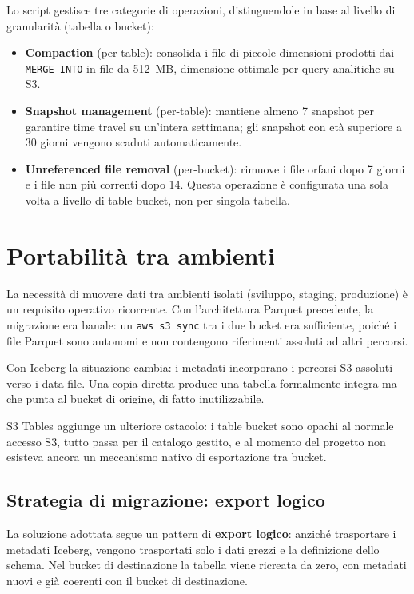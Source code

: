 \documentclass[12pt,a4paper,openright,twoside]{book}
\begin{document}
Lo script gestisce tre categorie di operazioni, distinguendole in base al livello di granularità (tabella o bucket):

\begin{itemize}
    \item \textbf{Compaction} (per-table): consolida i file di piccole dimensioni prodotti dai \texttt{MERGE INTO} in file da 512~MB, dimensione ottimale per query analitiche su S3.
    \item \textbf{Snapshot management} (per-table): mantiene almeno 7 snapshot per garantire time travel su un'intera settimana; gli snapshot con età superiore a 30 giorni vengono scaduti automaticamente.
    \item \textbf{Unreferenced file removal} (per-bucket): rimuove i file orfani dopo 7 giorni e i file non più correnti dopo 14. Questa operazione è configurata una sola volta a livello di table bucket, non per singola tabella.
\end{itemize}

\section{Portabilità tra ambienti}
\label{sec:migration}

La necessità di muovere dati tra ambienti isolati (sviluppo, staging, produzione) è un requisito operativo ricorrente. Con l'architettura Parquet precedente, la migrazione era banale: un \texttt{aws s3 sync} tra i due bucket era sufficiente, poiché i file Parquet sono autonomi e non contengono riferimenti assoluti ad altri percorsi.

Con Iceberg la situazione cambia: i metadati incorporano i percorsi S3 assoluti verso i data file. 
Una copia diretta produce una tabella formalmente integra ma che punta al bucket di origine, di fatto inutilizzabile.

S3 Tables aggiunge un ulteriore ostacolo: i table bucket sono opachi al normale accesso S3, tutto passa per il catalogo gestito, 
e al momento del progetto non esisteva ancora un meccanismo nativo di esportazione tra bucket. 

\newpage
\subsection{Strategia di migrazione: export logico}
\label{sec:migration-strategy}

La soluzione adottata segue un pattern di \textbf{export logico}: 
anziché trasportare i metadati Iceberg, vengono trasportati solo i dati grezzi e la definizione dello schema. 
Nel bucket di destinazione la tabella viene ricreata da zero, con metadati nuovi e già coerenti 
con il bucket di destinazione.
\end{document}
